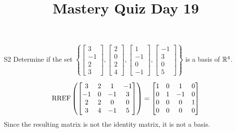 \documentclass{sbgLAquiz}
\title{Mastery Quiz Day 19 }
\begin{document}
\begin{problem}{S2}
  Determine if the set \(\left\{
    \begin{bmatrix} 3 \\ -1 \\ 2 \\3 \end{bmatrix},
    \begin{bmatrix} 2 \\ 0 \\ 2 \\ 4\end{bmatrix},
    \begin{bmatrix} 1 \\ -1 \\ 0 \\ -1\end{bmatrix},
    \begin{bmatrix} -1 \\ 3 \\ 0 \\ 5\end{bmatrix}
  \right\}\) is a basis of $\mathbb{R}^4$.
\end{problem}
\begin{solution}
  \[\operatorname{RREF}\left(
    \begin{bmatrix}
      3 & 2 & 1 & -1\\
      -1 & 0 & -1 & 3\\
      2 & 2 & 0 & 0\\
      3 & 4 & -1 & 5\\
    \end{bmatrix} \right)= \begin{bmatrix}
      1 & 0 & 1 & 0 \\
      0 & 1 & -1 & 0 \\
      0 & 0 & 0 & 1 \\
      0 & 0 & 0 & 0
    \end{bmatrix}
  \]
Since the resulting matrix is not the identity matrix, it is not a basis.
\end{solution}
\end{document}
